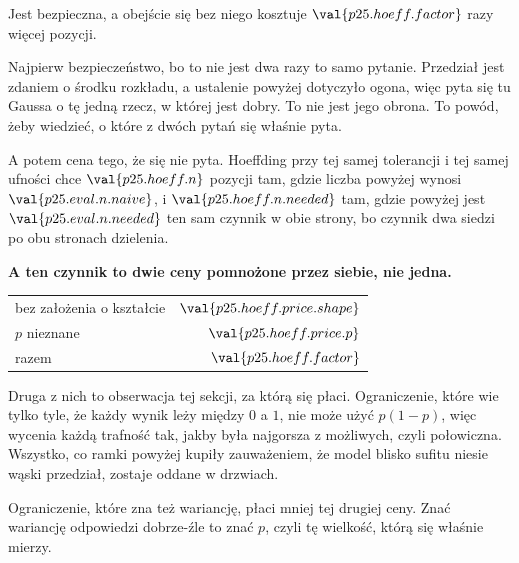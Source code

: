 \begin{fr}
\begin{ansblock}
Jest bezpieczna, a obejście się bez niego kosztuje $\val{p25.hoeff.factor}$
razy więcej pozycji.
\end{ansblock}

Najpierw bezpieczeństwo, bo to nie jest dwa razy to samo pytanie. Przedział jest
zdaniem o środku rozkładu, a ustalenie powyżej dotyczyło ogona, więc pyta się
tu Gaussa o tę jedną rzecz, w której jest dobry. To nie jest jego obrona. To
powód, żeby wiedzieć, o które z dwóch pytań się właśnie pyta.

A potem cena tego, że się nie pyta. Hoeffding przy tej samej tolerancji i tej samej
ufności chce $\val{p25.hoeff.n}$ pozycji tam, gdzie liczba powyżej wynosi
$\val{p25.eval.n.naive}$, i $\val{p25.hoeff.n.needed}$ tam, gdzie powyżej jest
$\val{p25.eval.n.needed}$ \dash{} ten sam czynnik w obie strony, bo czynnik
dwa siedzi po obu stronach dzielenia.

\textbf{A ten czynnik to dwie ceny pomnożone przez siebie, nie jedna.}

\begin{center}
\begin{tabular}{lr}
\toprule
bez założenia o kształcie & $\val{p25.hoeff.price.shape}$ \\
$p$ nieznane & $\val{p25.hoeff.price.p}$ \\
\midrule
razem & $\val{p25.hoeff.factor}$ \\
\bottomrule
\end{tabular}
\end{center}

Druga z nich to obserwacja tej sekcji, za którą się płaci. Ograniczenie, które
wie tylko tyle, że każdy wynik leży między $0$ a $1$, nie może użyć $p(1-p)$,
więc wycenia każdą trafność tak, jakby była najgorsza z możliwych, czyli
połowiczna. Wszystko, co ramki powyżej kupiły zauważeniem, że model blisko
sufitu niesie wąski przedział, zostaje oddane w drzwiach.

Ograniczenie, które zna też wariancję, płaci mniej tej drugiej ceny. Znać
wariancję odpowiedzi dobrze-źle to znać $p$, czyli tę wielkość, którą się
właśnie mierzy.
\end{fr}

